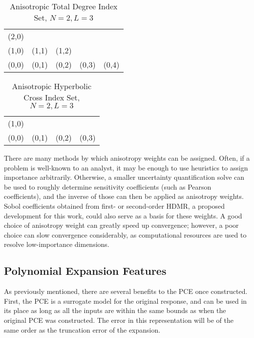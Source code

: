 \begin{table}[h]
  \centering
  \begin{tabular}{c c c c c}
    (2,0) &       &       &       & \\
    (1,0) & (1,1) & (1,2) &       & \\
    (0,0) & (0,1) & (0,2) & (0,3) & (0,4)
  \end{tabular}
  \caption{Anisotropic Total Degree Index Set, $N=2,L=3$}
  \label{tab:aniTD}
\end{table}

\begin{table}[h]
  \centering
  \begin{tabular}{c c c c}
    (1,0) &       &       &       \\
    (0,0) & (0,1) & (0,2) & (0,3)
  \end{tabular}
  \caption{Anisotropic Hyperbolic Cross Index Set, $N=2,L=3$}
  \label{tab:aniHC}
\end{table}

There are many methods by which anisotropy weights can be assigned.  Often, if a problem is well-known to an 
analyst, it may be enough to use heuristics to assign importance arbitrarily.  Otherwise, a smaller
uncertainty quantification solve can be used to roughly determine sensitivity coefficients (such as Pearson
coefficients), and the inverse of those can then be applied as anisotropy weights.  Sobol coefficients
obtained from first- or second-order HDMR, a proposed development for this work, could also serve as a basis for these weights.
A good choice of anisotropy weight can greatly speed up convergence; however, a
poor choice can slow convergence considerably, as computational resources are used to resolve low-importance
dimensions.


\subsection{Polynomial Expansion Features}
As previously mentioned, there are several benefits to the PCE once constructed.  First, the PCE is a
surrogate model for the original response, and can be used in its place as long as all the inputs are within
the same bounds as when the original PCE was constructed.  The error in this representation will be of the
same order as the truncation error of the expansion.

